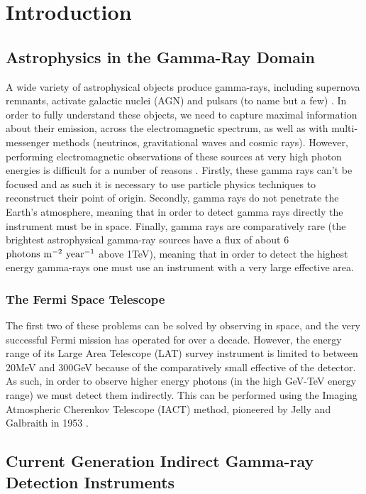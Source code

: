 \chapter{\label{ch:1-intro}Introduction} 
\minitoc
\section{Astrophysics in the Gamma-Ray Domain}
A wide variety of astrophysical objects produce gamma-rays, including supernova remnants, activate galactic nuclei (AGN) and pulsars (to name but a few) \cite{scienceCTA}. In order to fully understand these objects, we need to capture maximal information about their emission, across the electromagnetic spectrum, as well as with multi-messenger methods (neutrinos, gravitational waves and cosmic rays).  However, performing electromagnetic observations of these sources at very high photon energies is difficult for a number of reasons \cite{jamieiact}. Firstly, these gamma rays can't be focused and as such it is necessary to use particle physics techniques to reconstruct their point of origin. Secondly, gamma rays do not penetrate the Earth's atmosphere, meaning that in order to detect gamma rays directly the instrument must be in space. Finally, gamma rays are comparatively rare (the brightest astrophysical gamma-ray sources have a flux of about 6 $\rm{photons} \ \rm{m}^{-2}\ \rm{year}^{-1}$ above 1TeV\cite{jamieiact}), meaning that in order to detect the highest energy gamma-rays one must use an instrument with a very large effective area.

\subsection{The Fermi Space Telescope}
The first two of these problems can be solved by observing in space, and the very successful Fermi mission has operated for over a decade. However, the energy range of its Large Area Telescope (LAT) survey instrument is limited to between 20MeV and 300GeV because of the comparatively small effective of the detector. As such, in order to observe higher energy photons (in the high GeV-TeV energy range) we must detect them indirectly. This can be performed using the Imaging Atmospheric Cherenkov Telescope  (IACT) method, pioneered by Jelly and Galbraith in 1953 \cite{G+J}. 

\section{Current Generation Indirect Gamma-ray Detection Instruments}
